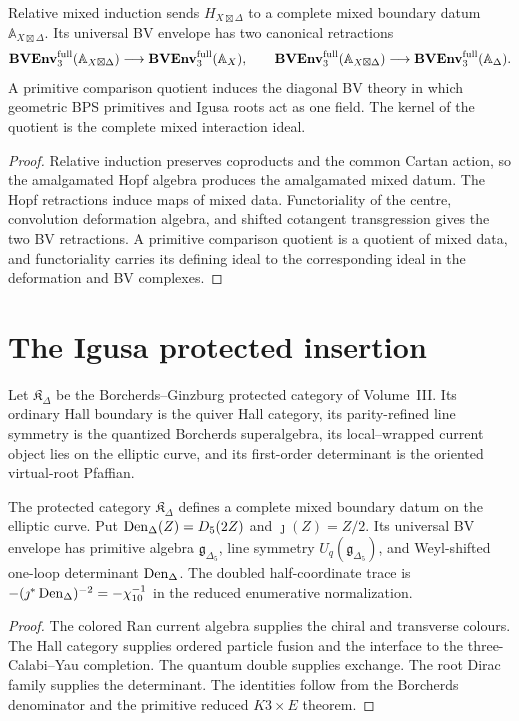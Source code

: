 \begin{theorem}
Relative mixed induction sends $H_{X\boxtimes\Delta}$ to a complete mixed boundary datum $\mathbb A_{X\boxtimes\Delta}$.  Its universal BV envelope has two canonical retractions
\[
 \mathbf{BVEnv}_3^{\mathrm{full}}(\mathbb A_{X\boxtimes\Delta})
 \longrightarrow
 \mathbf{BVEnv}_3^{\mathrm{full}}(\mathbb A_X),
 \qquad
 \mathbf{BVEnv}_3^{\mathrm{full}}(\mathbb A_{X\boxtimes\Delta})
 \longrightarrow
 \mathbf{BVEnv}_3^{\mathrm{full}}(\mathbb A_\Delta).
\]
A primitive comparison quotient induces the diagonal BV theory in which geometric BPS primitives and Igusa roots act as one field.  The kernel of the quotient is the complete mixed interaction ideal.
\end{theorem}
\begin{proof}
Relative induction preserves coproducts and the common Cartan action, so the amalgamated Hopf algebra produces the amalgamated mixed datum.  The Hopf retractions induce maps of mixed data.  Functoriality of the centre, convolution deformation algebra, and shifted cotangent transgression gives the two BV retractions.  A primitive comparison quotient is a quotient of mixed data, and functoriality carries its defining ideal to the corresponding ideal in the deformation and BV complexes.
\end{proof}

\chapter{The Igusa protected insertion}
Let $\mathfrak K_\Delta$ be the Borcherds--Ginzburg protected category of Volume~III.  Its ordinary Hall boundary is the quiver Hall category, its parity-refined line symmetry is the quantized Borcherds superalgebra, its local--wrapped current object lies on the elliptic curve, and its first-order determinant is the oriented virtual-root Pfaffian.

\begin{theorem}
The protected category $\mathfrak K_\Delta$ defines a complete mixed boundary datum on the elliptic curve.  Put $\operatorname{Den}_{\Delta}(Z)=D_5(2Z)$ and $\jmath(Z)=Z/2$.  Its universal BV envelope has primitive algebra $\mathfrak g_{\Delta_5}$, line symmetry $U_q(\mathfrak g_{\Delta_5})$, and Weyl-shifted one-loop determinant $\operatorname{Den}_{\Delta}$.  The doubled half-coordinate trace is $-(\jmath^*\operatorname{Den}_{\Delta})^{-2}=-\chi_{10}^{-1}$ in the reduced enumerative normalization.
\end{theorem}
\begin{proof}
The colored Ran current algebra supplies the chiral and transverse colours.  The Hall category supplies ordered particle fusion and the interface to the three-Calabi--Yau completion.  The quantum double supplies exchange.  The root Dirac family supplies the determinant.  The identities follow from the Borcherds denominator and the primitive reduced $K3\times E$ theorem.
\end{proof}

